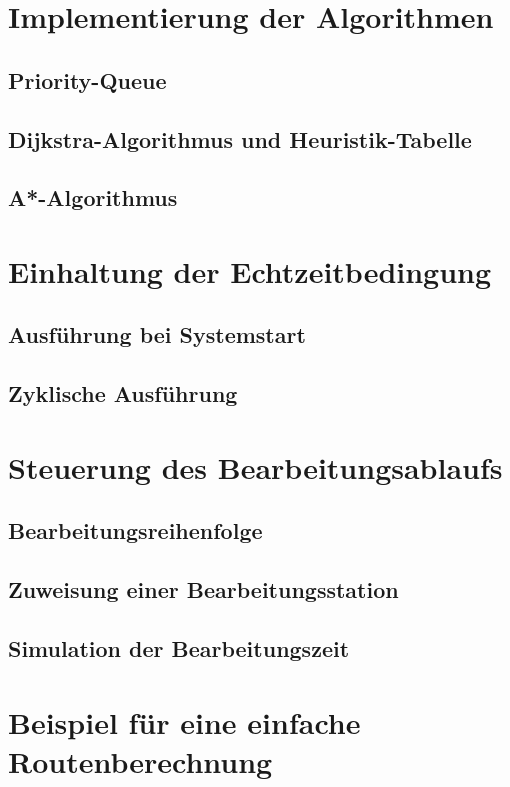 	\section{Implementierung der Algorithmen}
		
		
	
		\subsection{Priority-Queue}
	
		\subsection{Dijkstra-Algorithmus und Heuristik-Tabelle}
		

		\subsection{A*-Algorithmus}
	
	\section{Einhaltung der Echtzeitbedingung}
	
		\cite{BorisCherkassky1993}
	
		\subsection{Ausführung bei Systemstart}
		
		\subsection{Zyklische Ausführung}
		
	\section{Steuerung des Bearbeitungsablaufs}
	
		\subsection{Bearbeitungsreihenfolge}
		
		\subsection{Zuweisung einer Bearbeitungsstation}
		
		\subsection{Simulation der Bearbeitungszeit}
	
		
	\section{Beispiel für eine einfache Routenberechnung}